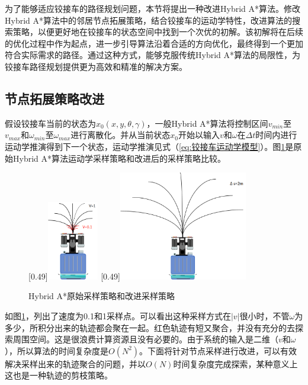 \documentclass[master,academic]{ysuthesis} %
\begin{document}
	为了能够适应铰接车的路径规划问题，本节将提出一种改进Hybrid A*算法。修改Hybrid A*算法中的邻居节点拓展策略，结合铰接车的运动学特性，改进算法的搜索策略，以便更好地在铰接车的状态空间中找到一个次优的初解。该初解将在后续的优化过程中作为起点，进一步引导算法沿着合适的方向优化，最终得到一个更加符合实际需求的路径。通过这种方式，能够克服传统Hybrid A*算法的局限性，为铰接车路径规划提供更为高效和精准的解决方案。
		\subsection{节点拓展策略改进}
		假设铰接车当前的状态为$x_0(x,y,\theta,\gamma)$，一般Hybrid A*算法将控制区间$v_{min}$至$v_{max}$和$\omega_{min}$至$\omega_{max}$进行离散化。并从当前状态$x_0$开始以输入$v$和$\omega$在$\Delta t$时间内进行运动学推演得到下一个状态，运动学推演见式（\ref{eq:铰接车运动学模型}）。图\ref{fig:Hybrid A*原始采样策略和改进采样策略}是原始Hybrid A*算法运动学采样策略和改进后的采样策略比较。 
		\begin{figure}[H]
			\centering
			[0.49\textwidth]{\includegraphics[width=0.2\textwidth]{hybrid采样.png}}
			[0.49\textwidth]{\includegraphics[width=0.5\textwidth]{hybrid采样改进剪枝.png}}
			\caption{Hybrid A*原始采样策略和改进采样策略}
			\label{fig:Hybrid A*原始采样策略和改进采样策略}
		\end{figure}
		如图\ref{fig:Hybrid A*原始采样策略和改进采样策略}，列出了速度为0.1和1采样点。可以看出这种采样方式在$|v|$很小时，不管$\omega$为多少，所积分出来的轨迹都会聚在一起。红色轨迹有短又聚合，并没有充分的去探索周围空间。这是很浪费计算资源且没有必要的。由于系统的输入是二维（$v$和$\omega$），所以算法的时间复杂度是$O(N^2)$。下面将针对节点采样进行改进，可以有效解决采样出来的轨迹聚合的问题，并以$O(N)$时间复杂度完成探索，某种意义上这也是一种轨迹的剪枝策略。 
\end{document}
